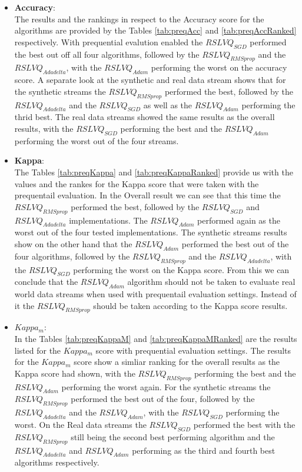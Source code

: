 \documentclass[12pt,oneside,a4paper,parskip]{scrbook}
\begin{document}
\begin{itemize}
  \item \textbf{Accuracy}: \\
  The results and the rankings in respect to the Accuracy score for the algorithms are provided by the Tables \ref{tab:preqAcc} and \ref{tab:preqAccRanked}
  respectively.
  With prequential evalution enabled the $RSLVQ_\textit{SGD}$ performed the best out off all four algorithms, followed by the 
  $RSLVQ_\textit{RMSprop}$ and the $RSLVQ_\textit{Adadelta}$, with the $RSLVQ_\textit{Adam}$ performing the worst on the accuracy score.
  A separate look at the synthetic and real data stream shows that for the synthetic streams the $RSLVQ_\textit{RMSprop}$ performed the best,
  followed by the $RSLVQ_\textit{Adadelta}$ and the $RSLVQ_\textit{SGD}$ as well as the $RSLVQ_\textit{Adam}$ performing the thrid best.
  The real data streams showed the same results as the overall results, with the $RSLVQ_\textit{SGD}$ performing the best and the $RSLVQ_\textit{Adam}$ performing
  the worst out of the four streams.

  \item \textbf{Kappa}: \\
  The Tables \ref{tab:preqKappa} and \ref{tab:preqKappaRanked} provide us with the values and the rankes for the Kappa score that were taken with the
  prequentail evaluation.
  In the Overall result we can see that this time the $RSLVQ_\textit{RMSprop}$ performed the best, followed by the $RSLVQ_\textit{SGD}$ 
  and $RSLVQ_\textit{Adadelta}$ implementations. The $RSLVQ_\textit{Adam}$ performed again as the worst out of the four tested implementations.
  The synthetic streams results show on the other hand that the $RSLVQ_\textit{Adam}$ performed the best out of the four algorithms, followed by 
  the $RSLVQ_\textit{RMSprop}$ and the $RSLVQ_\textit{Adadelta}$, with the $RSLVQ_\textit{SGD}$ performing the worst on the Kappa score.
  From this we can conclude that the $RSLVQ_\textit{Adam}$ algorithm should not be taken to evaluate real world data streams when used with
  prequentail evaluation settings. Instead of it the $RSLVQ_\textit{RMSprop}$ should be taken according to the Kappa score results.
  
  \item \textbf{$Kappa_m$}: \\
  In the Tables \ref{tab:preqKappaM} and \ref{tab:preqKappaMRanked} are the results listed for the $Kappa_m$ score with prequential evaluation settings.
  The results for the $Kappa_m$ score show a simliar ranking for the overall results as the Kappa score had shown, with the 
  $RSLVQ_\textit{RMSprop}$ performing the best and the $RSLVQ_\textit{Adam}$ performing the worst again.
  For the synthetic streams the $RSLVQ_\textit{RMSprop}$ performed the best out of the four, followed by the $RSLVQ_\textit{Adadelta}$ and the
  $RSLVQ_\textit{Adam}$, with the $RSLVQ_\textit{SGD}$ performing the worst.
  On the Real data streams the $RSLVQ_\textit{SGD}$ performed the best with the $RSLVQ_\textit{RMSprop}$ still being the second best performing
  algorithm and the $RSLVQ_\textit{Adadelta}$ and $RSLVQ_\textit{Adam}$ performing as the third and fourth best algorithms respectively.
  

\end{itemize}
\end{document}
